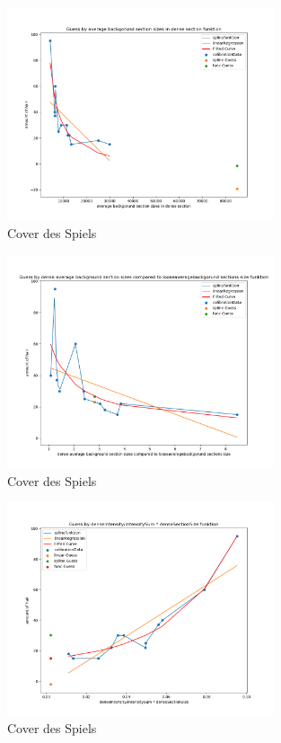 \documentclass[german,a4paper,12pt,smallheadings,headsepline, titlepage, liststotoc, idextotoc,bibtoctoc,blibliography = totocnumbered]{scrartcl}
\begin{document}
\begin{figure}
	\centering
	\includegraphics[width=0.7\textwidth]{fig64/g09_avgbackgroundsectionsizes.png}
	\caption[]{Cover des Spiels}
	\label{img:cover}
\end{figure}
\begin{figure}
	\centering
	\includegraphics[width=0.7\textwidth]{fig64/g10_denseavgbackgroundsizeVSlooseavg.png}
	\caption[]{Cover des Spiels}
	\label{img:cover}
\end{figure}
\begin{figure}
	\centering
	\includegraphics[width=0.7\textwidth]{fig64/g11_denseIntensitynorm.png}
	\caption[]{Cover des Spiels}
	\label{img:cover}
\end{figure}
\end{document}
